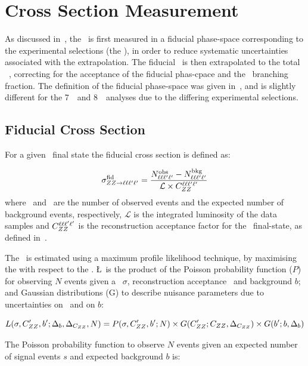 \section{Cross Section Measurement}

As discussed in~, the \cx\ is first measured in a fiducial phase-space
corresponding to the experimental selections (the ), in
order to reduce systematic uncertainties associated with the extrapolation. The
fiducial \cx\ is then extrapolated to the total \ZZ\ \cx, correcting for the
acceptance of the fiducial phas-cpace and the \ZZllll\ branching fraction.  The definition of the
fiducial phase-space was given in~, and is slightly different for the
7~\tev\ and 8~\tev\ analyses due to the differing experimental selections.

\subsection{Fiducial Cross Section}

For a given \ZZllll\ final state the fiducial cross section is defined as:

\begin{equation}\label{eq:xsecfid_fourl}
\sigma_{ZZ\rightarrow\ell\ell\ell'\ell'}^{\rm fid} = \frac{N^{\rm obs}_{\ell\ell\ell'\ell'} - N^{\rm bkg}_{\ell\ell\ell'\ell'}}{\mathcal{L} \times C_{ZZ}^{\ell\ell\ell'\ell'}}
\end{equation}
where \NObs\ and \NBg\ are the number of observed events and the expected number
of background events, respectively, $\mathcal{L}$ is the integrated luminosity
of the data samples and
$C_{ZZ}^{\ell\ell\ell'\ell'}$ is the reconstruction acceptance factor for the \lllplp\
final-state, as defined in~.

The \cx\ is estimated using a maximum profile likelihood technique, by
maximising the \intro{profile likelihood function, \L} with respect to the \cx.
\L\ is the product of the Poisson probability function ($P$) for observing $N$ events given a
\cx\ $\sigma$, reconstruction acceptance \CZZ\ and background $b$; and Gaussian
distributions (G) to describe nuisance parameters due to uncertainties on \CZZ\
and on $b$:

\begin{equation}
\small
   L(\sigma, C_{ZZ}', b'; \Delta_{b}, \Delta_{C_{ZZ}}, N) = P(\sigma, C_{ZZ}^\prime,
   b^\prime; N)\times G(C_{ZZ}^\prime; C_{ZZ}, \Delta_{C_{ZZ}}) \times G(b^\prime; b, \Delta_{b})
\end{equation}

The Poisson probability function to observe $N$ events given an expected
number of signal events $s$ and expected background $b$ is:

